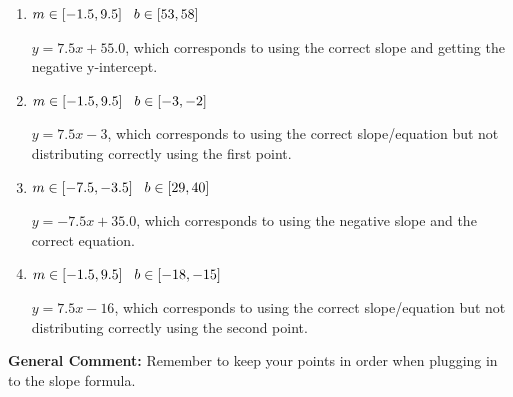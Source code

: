 \documentclass{extbook}[14pt]
\begin{document}
\begin{enumerate}
{\begin{enumerate}[label=\Alph*.]
* $y = 7.5x -55.0$, which is the correct option.
\item \( m \in [-1.5, 9.5] \hspace*{3mm} b \in [53, 58] \)

 $y = 7.5x + 55.0$, which corresponds to using the correct slope and getting the negative y-intercept.
\item \( m \in [-1.5, 9.5] \hspace*{3mm} b \in [-3, -2] \)

 $y = 7.5x -3$, which corresponds to using the correct slope/equation but not distributing correctly using the first point.
\item \( m \in [-7.5, -3.5] \hspace*{3mm} b \in [29, 40] \)

 $y = -7.5x + 35.0$, which corresponds to using the negative slope and the correct equation.
\item \( m \in [-1.5, 9.5] \hspace*{3mm} b \in [-18, -15] \)

 $y = 7.5x -16$, which corresponds to using the correct slope/equation but not distributing correctly using the second point.
\end{enumerate}

\textbf{General Comment:} Remember to keep your points in order when plugging in to the slope formula.
}
\end{enumerate}
\end{document}
